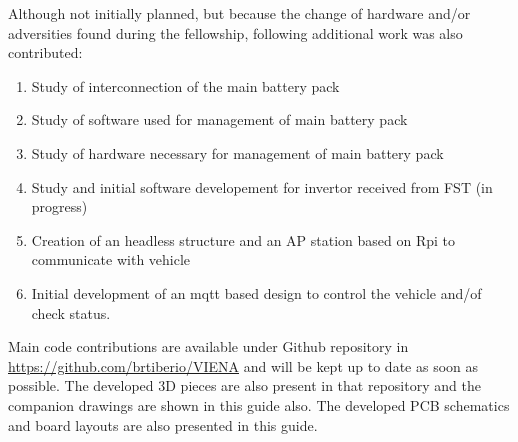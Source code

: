 Although not initially planned, but because the change of hardware and/or adversities found during the fellowship, following additional work was also contributed:
\begin{enumerate}
	\tightlist
	\item Study of interconnection of the main battery pack
	\item Study of software used for management of main battery pack
	\item Study of hardware necessary for management of main battery pack
	\item Study and initial software developement  for invertor received from \acrshort{FST} (in progress)
	\item Creation of an headless structure and an AP station based on \gls{Rpi} to communicate with vehicle
	\item Initial development of an mqtt based design to control the vehicle and/of check status. 
\end{enumerate}

Main code contributions are available under Github repository in \url{https://github.com/brtiberio/VIENA} and will be kept up to date as soon as possible.
The developed 3D pieces are also present in that repository and the companion drawings are shown in this guide also.
The developed PCB schematics and board layouts are also presented in this guide.





